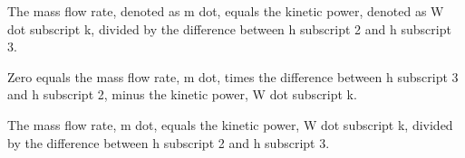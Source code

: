 The mass flow rate, denoted as m dot, equals the kinetic power, denoted as W dot subscript k, divided by the difference between h subscript 2 and h subscript 3.

Zero equals the mass flow rate, m dot, times the difference between h subscript 3 and h subscript 2, minus the kinetic power, W dot subscript k.

The mass flow rate, m dot, equals the kinetic power, W dot subscript k, divided by the difference between h subscript 2 and h subscript 3.